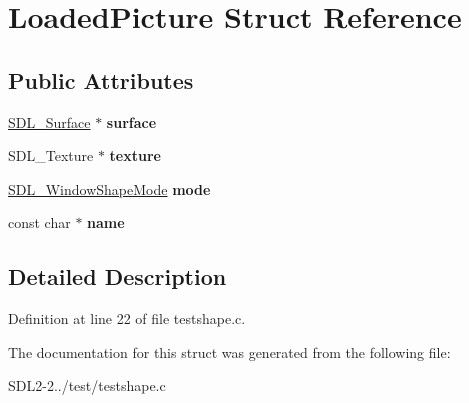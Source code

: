 \hypertarget{structLoadedPicture}{\section{Loaded\+Picture Struct Reference}
\label{structLoadedPicture}
}
\subsection*{Public Attributes}
\begin{DoxyCompactItemize}
\item 
\hypertarget{structLoadedPicture_ad188d869ded0ab54d5f4e749fd3f885a}{\hyperlink{structSDL__Surface}{S\+D\+L\+\_\+\+Surface} $\ast$ {\bfseries surface}}\label{structLoadedPicture_ad188d869ded0ab54d5f4e749fd3f885a}

\item 
\hypertarget{structLoadedPicture_a88f8510bffd2294afa86748e316f1812}{S\+D\+L\+\_\+\+Texture $\ast$ {\bfseries texture}}\label{structLoadedPicture_a88f8510bffd2294afa86748e316f1812}

\item 
\hypertarget{structLoadedPicture_ac610a9b081d66683923d42d2edd4875f}{\hyperlink{structSDL__WindowShapeMode}{S\+D\+L\+\_\+\+Window\+Shape\+Mode} {\bfseries mode}}\label{structLoadedPicture_ac610a9b081d66683923d42d2edd4875f}

\item 
\hypertarget{structLoadedPicture_ad0dee7676eac82551b3083a47cf8de14}{const char $\ast$ {\bfseries name}}\label{structLoadedPicture_ad0dee7676eac82551b3083a47cf8de14}

\end{DoxyCompactItemize}


\subsection{Detailed Description}


Definition at line 22 of file testshape.\+c.



The documentation for this struct was generated from the following file\+:\begin{DoxyCompactItemize}
\item 
S\+D\+L2-\/2../test/testshape.\+c\end{DoxyCompactItemize}
